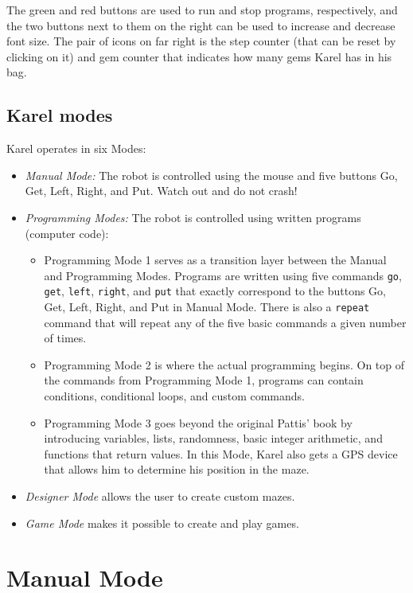 The green and red 
buttons are used to run and stop programs, respectively, and the two buttons next to them on
the right can be used to increase and decrease font size. The pair of icons on far right is the 
step counter (that can be reset by clicking on it) and gem counter that indicates how many gems 
Karel has in his bag.

\subsection{Karel modes} \label{modes}

Karel operates in six Modes:
\begin{itemize}
\item {\em Manual Mode:} The robot is controlled using the mouse and five buttons Go, Get, Left, Right, and Put. 
      Watch out and do not crash!
\item {\em Programming Modes:} The robot is controlled using written programs (computer code):
\begin{itemize}
\item Programming Mode 1 serves 
      as a transition layer between the Manual and Programming Modes. Programs are written using 
      five commands {\tt go}, {\tt get}, {\tt left}, {\tt right}, and {\tt put} that exactly correspond to 
      the buttons Go, Get, Left, Right, and Put in Manual Mode. There is also a {\tt repeat} command that 
      will repeat any of the five basic commands a given number of times. 
\item Programming Mode 2 is where the actual programming begins. On top of the commands from Programming Mode 1, 
      programs can contain conditions, conditional loops, and custom commands.
\item Programming Mode 3 goes beyond the original Pattis' book by introducing variables, lists, randomness, 
      basic integer arithmetic, and functions that 
      return values. In this Mode, Karel also gets a GPS device that allows him to determine his position 
      in the maze. 
\end{itemize}
\item {\em Designer Mode} allows the user to create custom mazes.
\item {\em Game Mode} makes it possible to create and play games. 
\end{itemize}


\section{Manual Mode} \label{sec:manual}

